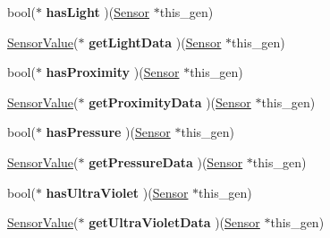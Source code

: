 \begin{DoxyCompactItemize}
\item 
\hypertarget{struct___sensor_afc68df6cf816c3574813cf1f9017a819}{bool($\ast$ {\bfseries has\-Light} )(\hyperlink{struct___sensor}{Sensor} $\ast$this\-\_\-gen)}\label{struct___sensor_afc68df6cf816c3574813cf1f9017a819}

\item 
\hypertarget{struct___sensor_a15b14e23aff03394ed0abdff09e26d66}{\hyperlink{struct___sensor_value}{Sensor\-Value}($\ast$ {\bfseries get\-Light\-Data} )(\hyperlink{struct___sensor}{Sensor} $\ast$this\-\_\-gen)}\label{struct___sensor_a15b14e23aff03394ed0abdff09e26d66}

\item 
\hypertarget{struct___sensor_a686e07aff9bd69219a47a4d87a9b1248}{bool($\ast$ {\bfseries has\-Proximity} )(\hyperlink{struct___sensor}{Sensor} $\ast$this\-\_\-gen)}\label{struct___sensor_a686e07aff9bd69219a47a4d87a9b1248}

\item 
\hypertarget{struct___sensor_afadf3dad37ee0f73dcfdfc0c5fd0479b}{\hyperlink{struct___sensor_value}{Sensor\-Value}($\ast$ {\bfseries get\-Proximity\-Data} )(\hyperlink{struct___sensor}{Sensor} $\ast$this\-\_\-gen)}\label{struct___sensor_afadf3dad37ee0f73dcfdfc0c5fd0479b}

\item 
\hypertarget{struct___sensor_a8270d02857d9538db0af9dc901d80377}{bool($\ast$ {\bfseries has\-Pressure} )(\hyperlink{struct___sensor}{Sensor} $\ast$this\-\_\-gen)}\label{struct___sensor_a8270d02857d9538db0af9dc901d80377}

\item 
\hypertarget{struct___sensor_a99c4b7c5e29cdb006faa0ad7711c5b43}{\hyperlink{struct___sensor_value}{Sensor\-Value}($\ast$ {\bfseries get\-Pressure\-Data} )(\hyperlink{struct___sensor}{Sensor} $\ast$this\-\_\-gen)}\label{struct___sensor_a99c4b7c5e29cdb006faa0ad7711c5b43}

\item 
\hypertarget{struct___sensor_ab2e3888e66a24a3e655d9603a477651b}{bool($\ast$ {\bfseries has\-Ultra\-Violet} )(\hyperlink{struct___sensor}{Sensor} $\ast$this\-\_\-gen)}\label{struct___sensor_ab2e3888e66a24a3e655d9603a477651b}

\item 
\hypertarget{struct___sensor_a44d11b10e3d6e9eaf26e6dfb4fb4e028}{\hyperlink{struct___sensor_value}{Sensor\-Value}($\ast$ {\bfseries get\-Ultra\-Violet\-Data} )(\hyperlink{struct___sensor}{Sensor} $\ast$this\-\_\-gen)}\label{struct___sensor_a44d11b10e3d6e9eaf26e6dfb4fb4e028}


\end{DoxyCompactItemize}
